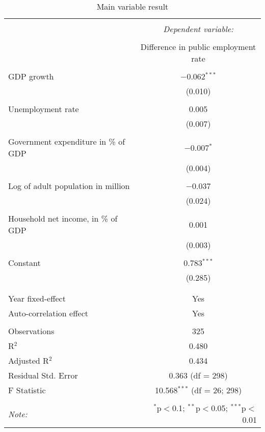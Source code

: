 
\begin{table}[!htbp] \centering 
  \caption{Main variable result} 
  \label{} 
\begin{tabular}{@{\extracolsep{5pt}}lc} 
\\[-1.8ex]\hline 
\hline \\[-1.8ex] 
 & \multicolumn{1}{c}{\textit{Dependent variable:}} \\ 
\cline{2-2} 
\\[-1.8ex] & Difference in public employment rate \\ 
\hline \\[-1.8ex] 
 GDP growth & $-$0.062$^{***}$ \\ 
  & (0.010) \\ 
  & \\ 
 Unemployment rate & 0.005 \\ 
  & (0.007) \\ 
  & \\ 
 Government expenditure in \% of GDP & $-$0.007$^{*}$ \\ 
  & (0.004) \\ 
  & \\ 
 Log of adult population in million & $-$0.037 \\ 
  & (0.024) \\ 
  & \\ 
 Household net income, in \% of GDP & 0.001 \\ 
  & (0.003) \\ 
  & \\ 
 Constant & 0.783$^{***}$ \\ 
  & (0.285) \\ 
  & \\ 
\hline \\[-1.8ex] 
Year fixed-effect & Yes \\ 
Auto-correlation effect & Yes \\ 
\hline \\[-1.8ex] 
Observations & 325 \\ 
R$^{2}$ & 0.480 \\ 
Adjusted R$^{2}$ & 0.434 \\ 
Residual Std. Error & 0.363 (df = 298) \\ 
F Statistic & 10.568$^{***}$ (df = 26; 298) \\ 
\hline 
\hline \\[-1.8ex] 
\textit{Note:}  & \multicolumn{1}{r}{$^{*}$p$<$0.1; $^{**}$p$<$0.05; $^{***}$p$<$0.01} \\ 
\end{tabular} 
\end{table} 
